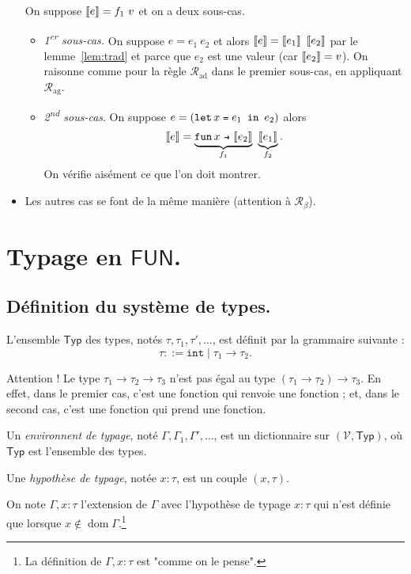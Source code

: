 \documentclass[../main]{subfiles}
\begin{document}
\begin{prv}
\begin{itemize}
        On suppose $\left\llbracket e\right\rrbracket = f_1\ v$ et on a deux sous-cas.
        \begin{itemize}
          \item \textit{1\textsuperscript{er} sous-cas.}
            On suppose $e = e_1\ e_2$ et alors $\left\llbracket e\right\rrbracket = \left\llbracket e_1\right\rrbracket\ \left\llbracket e_2\right\rrbracket$ par le lemme~\ref{lem:trad} et parce que $e_2$ est une valeur (car $\left\llbracket e_2\right\rrbracket = v$).
            On raisonne comme pour la règle $\mathcal{R}_\mathrm{ad}$ dans le premier sous-cas, en appliquant $\mathcal{R}_\mathrm{ag}$.
          \item \textit{2\textsuperscript{nd} sous-cas}.
            On suppose $e = (\letin x {e_1} {e_2})$ alors \[
              \trad e = \underbrace{\fun x {\trad{e_2}}}_{f_1}\ \underbrace{\trad{e_1}}_{f_2}
            .\]
            On vérifie aisément ce que l'on doit montrer.
        \end{itemize}
      \item Les autres cas se font de la même manière (attention à $\mathcal{R}_\beta$).
    \end{itemize}
  \end{prv}

  \section{Typage en $\mathsf{FUN}$.}
  \subsection{Définition du système de types.}

  L'ensemble $\mathsf{Typ}$ des types, notés $\tau, \tau_1, \tau',\ldots$, est définit par la grammaire suivante : \[
  \tau ::= \mathtt{int}  \mid  \tau_1 \to \tau_2
  .\]

  \begin{note}
    Attention ! Le type $\tau_1 \to \tau_2 \to \tau_3$ n'est pas égal au type $(\tau_1 \to \tau_2) \to \tau_3$.
    En effet, dans le premier cas, c'est une fonction qui renvoie une fonction ; et, dans le second cas, c'est une fonction qui prend une fonction.
  \end{note}

  \begin{defn}
    Un \textit{environnent de typage}, noté $\Gamma, \Gamma_1, \Gamma',\ldots$, est un dictionnaire sur $(\mathcal{V}, \mathsf{Typ})$, où $\mathsf{Typ}$ est l'ensemble des types.

    Une \textit{hypothèse de typage}, notée $x:\tau$, est un couple $(x,\tau)$.

    On note $\Gamma, x : \tau$ l'extension de $\Gamma$ avec l'hypothèse de typage $x : \tau$ qui n'est définie que lorsque  $x \not\in \operatorname{dom} \Gamma$.\footnote{La définition de $\Gamma, x : \tau$ est "comme on le pense".}
  \end{defn}
\end{document}
